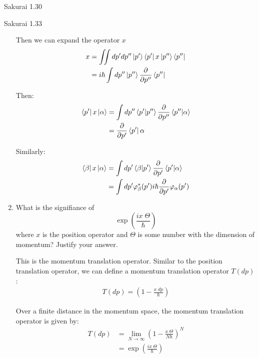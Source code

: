 \documentclass{article}
\begin{document}
\begin{section}{Sakurai 1.30}
\begin{section}{Sakurai 1.33}
\begin{enumerate}
\begin{tcolorbox}[breakable]
		Then we can expand the operator $x$
		\begin{align*}
			x & = \iint dp' dp'' \ket{p'} \bra{p'}x\ket{p''} \bra{p''}               \\
			  & = i\hbar \int dp'' \ket{p''} \frac{\partial}{\partial p''} \bra{p''} \\
		\end{align*}

		Then:
		\begin{align*}
			\bra{p'} x \ket{\alpha} & = \int dp'' \bra{p'}\ket{p''} \frac{\partial}{\partial p''} \bra{p''}\ket{\alpha} \\
			                        & = \frac{\partial}{\partial p'} \bra{p'}{\alpha}
		\end{align*}

		Similarly:
		\begin{align*}
			\bra{\beta}{x}\ket{\alpha} & = \int dp' \bra{\beta}\ket{p'} \frac{\partial}{\partial p'} \bra{p'}\ket{\alpha}      \\
			                           & = \int dp' \varphi_\beta^*(p') i\hbar \frac{\partial}{\partial p'} \varphi_\alpha(p')
		\end{align*}
	\end{tcolorbox}

	\newpage
	\item What is the signifiance of
	$$
		\exp \left( \frac{i x \; \Theta}{\hbar} \right)
	$$
	where $x$ is the position operator and $\Theta$ is some number with the dimension of momentum? Justify your answer.

	\begin{tcolorbox}
		This is the momentum translation operator. Similar to the position translation operator, we can define a momentum translation operator $T(dp)$:
		\begin{align*}
			T(dp) = \left( 1 - \frac{x \; dp}{\hbar} \right)
		\end{align*}

		Over a finite distance in the momentum space, the momentum translation operator is given by:
		\begin{align*}
			T(dp) & = \lim_{N \to \infty} \left( 1 - \frac{x \; \Theta}{N\hbar} \right)^N \\
			      & = \exp \left( \frac{i x \; \Theta}{\hbar} \right)
		\end{align*}
	\end{tcolorbox}
\end{enumerate}
\end{section}
\end{section}
\end{document}
